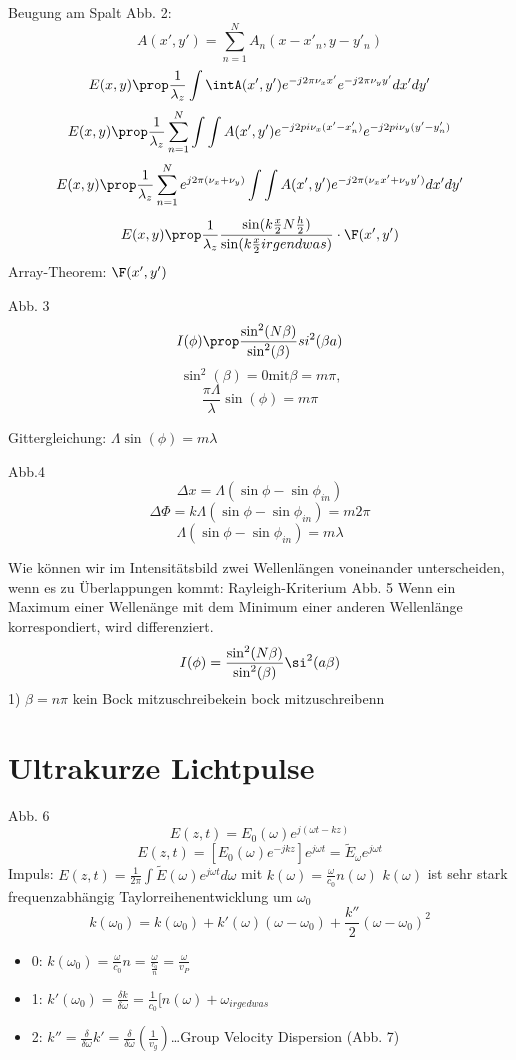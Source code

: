 \documentclass[a4paper]{article}
\begin{document}
Beugung am Spalt Abb. 2:
\[ A(x',y')=\sum_{n=1}^{N} A_{n}(x-x'_{n}, y-y'_{n}) \]
\[ E(x,y)\prop \frac{1}{\lambda_{z}}\int\intA(x',y')e^{-j2\pi\nu_{x}x'}e^{-j2\pi\nu_{y}y'}dx'dy'\]
\[ E(x,y)\prop \frac{1}{\lambda_{z}}\sum_{n=1}^{N} \int\int A(x',y')e^{-j2pi\nu_{x}(x'-x'_{n})}e^{-j2pi\nu_{y}(y'-y'_{n})}\]
\[ E(x,y)\prop \frac{1}{\lambda_z}\sum_{n=1}^{N} e^{j2\pi(\nu_{x}+\nu_y)} \int\int A(x',y')e^{-j2\pi(\nu_{x}x'+\nu_{y}y')}dx'dy' \]
\[ E(x,y)\prop \frac{1}{\lambda_{z}} \frac{
 \sin(k \frac{x}{2}N \frac{h}{2})       
}{
 \sin(k \frac{x}{2}irgendwas) 
}
\cdot \F(x',y')\]
Array-Theorem: $\F(x',y')$

Abb. 3
 \[ I(\phi)\prop \frac{\sin^{2}(N\beta)}{\sin^2(\beta)} si^{2}(\beta a)\]
 \[ \sin^{2}(\beta)=0\text{mit} \beta=m\pi\text{,}\]
\[ \frac{\pi \Lambda}{\lambda}\sin(\phi)=m\pi \]
 
 Gittergleichung: $\Lambda \sin(\phi)=m \lambda$

 Abb.4
\[ \Delta x=\Lambda(\sin\phi-\sin\phi_{in}) \]
\[ \Delta \Phi=k\Lambda(\sin\phi-\sin\phi_{in})=m2\pi \]
\[ \Lambda(\sin\phi-\sin\phi_{in})=m\lambda \]

Wie können wir im Intensitätsbild zwei Wellenlängen voneinander unterscheiden, wenn es zu Überlappungen kommt: Rayleigh-Kriterium Abb. 5
Wenn ein Maximum einer Wellenänge mit dem Minimum einer anderen Wellenlänge korrespondiert, wird differenziert.
\[ I(\phi)=\frac{\sin^{2}(N\beta)}{\sin^{2}(\beta)} \si^{2}(a \beta)\]
1) $\beta=n\pi$
kein Bock mitzuschreibekein bock mitzuschreibenn

\section*{Ultrakurze Lichtpulse}
Abb. 6
\[ E(z, t)=E_{0}(\omega)e^{j(\omega t-kz)} \]
\[ E(z,t)=[E_{0}(\omega)e^{-jkz}]e^{j\omega t}=\tilde{E}_{\omega}e^{j\omega t}\]
Impuls: $E(z,t)=\frac{1}{2\pi}\int \tilde{E}(\omega)e^{j\omega t}d\omega$ mit $k(\omega)=\frac{\omega}{c_{0}}n(\omega)$
$k(\omega)$ ist sehr stark frequenzabhängig \implies Taylorreihenentwicklung um $\omega_{0}$
 \[ k(\omega_{0})=k(\omega_0) + k'(\omega)(\omega-\omega_{0}) + \frac{k''}{2}(\omega-\omega_0)^{2} \]
 \begin{itemize}
     \item 0: $k(\omega_{0})=\frac{\omega}{c_{0}}n=\frac{\omega}{\frac{c_{0}}{n}}=\frac{\omega}{v_{P}}$
     \item 1: $k'(\omega_{0})=\frac{\delta k}{\delta\omega}=\frac{1}{c_{0}}[n(\omega)+\omega_{irgedwas}$
     \item 2: $k''=\frac{\delta}{\delta\omega} k'=\frac{\delta}{\delta\omega}(\frac{1}{v_{g}})$\ldots Group Velocity Dispersion (Abb. 7)
 \end{itemize}
\end{document}
